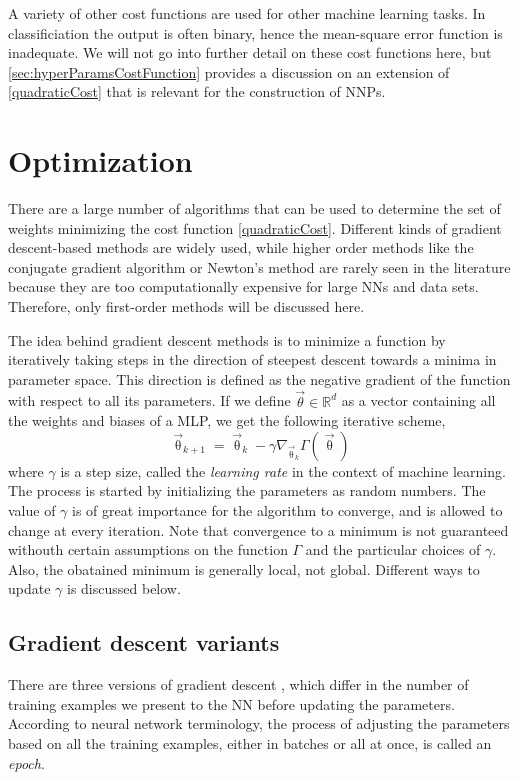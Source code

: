 \documentclass[twoside,english]{uiofysmaster}
\begin{document}
A variety of other cost functions are used for other machine learning tasks. In classificiation the output is often binary, 
hence the mean-square error function is inadequate. We will not go into further detail on these cost functions here, but 
\autoref{sec:hyperParamsCostFunction} provides a discussion on an extension of \eqref{quadraticCost} that is relevant for 
the construction of NNPs. 


\section{Optimization} \label{sec:optimization}
There are a large number of algorithms that can be used to determine the set of weights minimizing the 
cost function \eqref{quadraticCost}. 
Different kinds of gradient descent-based methods are widely used, while higher order methods like
the conjugate gradient algorithm or Newton's method are rarely seen in the literature because they are 
too computationally expensive for large NNs and data sets. Therefore, only first-order methods will be discussed here. 

The idea behind gradient descent methods is to minimize a function by 
iteratively taking steps in the direction of steepest descent towards a minima in parameter space. 
This direction is defined as the negative gradient of the function with respect to 
all its parameters. If we define $\vec{\theta} \in \mathbb{R}^d$ as a vector containing all the weights and biases
of a MLP, we get the following iterative scheme,
\begin{equation}
 \vec{\uptheta}_{k+1} = \vec{\uptheta}_{k} - \gamma \nabla_{\vec{\uptheta}_k} \Gamma(\vec{\uptheta})
 \label{gradientDescent}
\end{equation}
where $\gamma$ is a step size, called the \textit{learning rate} in the context of machine learning. The process is started
by initializing the parameters as random numbers. The value of $\gamma$ is of great importance for the algorithm to converge,
and is allowed to change at every iteration. Note that convergence to 
a minimum is not guaranteed withouth certain assumptions on the function $\Gamma$ and the particular choices of $\gamma$.
Also, the obatained minimum is generally local, not global. 
Different ways to update $\gamma$ is discussed below.


\subsection{Gradient descent variants} \label{sec:gradientDescentVariants}
There are three versions of gradient descent \cite{Ruder16}, which differ in 
the number of training examples we present to the NN before updating the parameters. 
According to neural network terminology, the process of adjusting the parameters based on all the training examples,
either in batches or all at once, is called an \textit{epoch}. 
\end{document}
